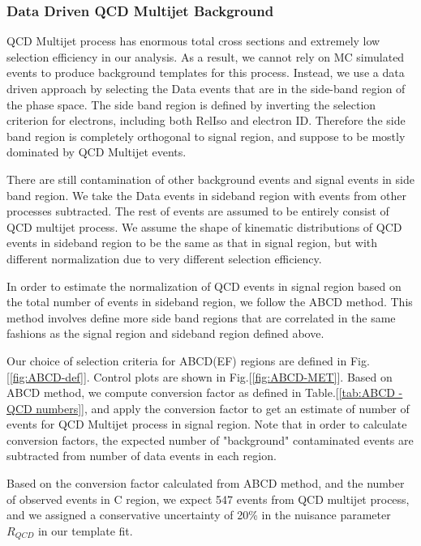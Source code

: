 \subsubsection* {Data Driven QCD Multijet Background}
\label{sec:data driven qcd}

QCD Multijet process has enormous total cross sections and extremely low selection efficiency in our analysis. As a result, we cannot rely on MC simulated events to produce background templates for this process. Instead, we use a data driven approach by selecting the Data events that are in the side-band region of the phase space. The side band region is defined by inverting the selection criterion for electrons, including both RelIso and electron ID. Therefore the side band region is completely orthogonal to signal region, and suppose to be mostly dominated by QCD Multijet events. 

There are still contamination of other background events and signal events in side band region. We take the Data events in sideband region with events from other processes subtracted. The rest of events are assumed to be entirely consist of QCD multijet process. We assume the shape of kinematic distributions of QCD events in sideband region to be the same as that in signal region, but with different normalization due to very different selection efficiency. 

In order to estimate the normalization of QCD events in signal region based on the total number of events in sideband region, we follow the ABCD method. This method involves define more side band regions that are correlated in the same fashions as the signal region and sideband region defined above. 

Our choice of selection criteria for ABCD(EF) regions are defined in Fig.[\ref{fig:ABCD-def}].  Control plots are shown in Fig.[\ref{fig:ABCD-MET}]. Based on ABCD method, we compute conversion factor as defined in Table.[\ref{tab:ABCD - QCD numbers}], and apply the conversion factor to get an estimate of number of events for QCD Multijet process in signal region. Note that in order to calculate conversion factors, the expected number of "background" contaminated events are subtracted from number of data events in each region. 

Based on the conversion factor calculated from ABCD method, and the number of observed events in C region, we expect 547 events from QCD multijet process, and we assigned a conservative uncertainty of 20\% in the nuisance parameter $R_{QCD}$ in our template fit. 

